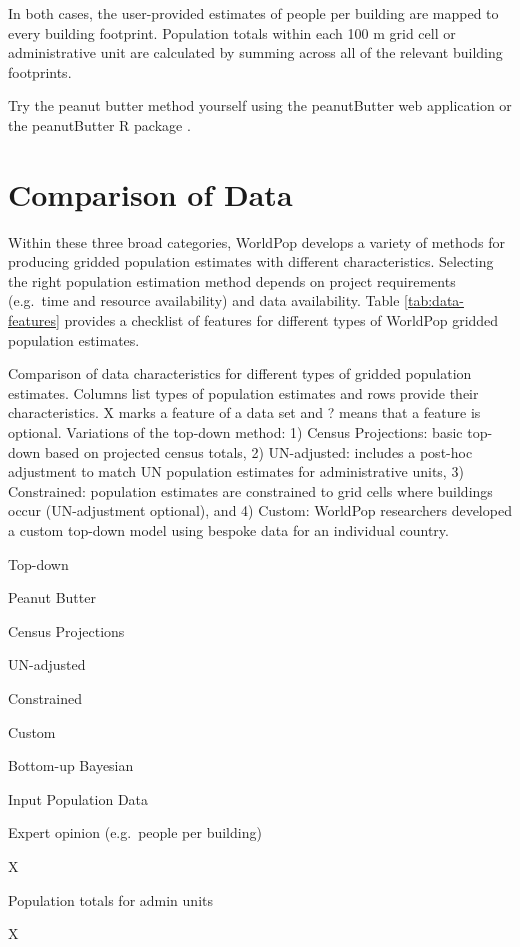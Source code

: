 \documentclass[]{book}
\begin{document}
In both cases, the user-provided estimates of people per building are
mapped to every building footprint. Population totals within each 100 m
grid cell or administrative unit are calculated by summing across all of
the relevant building footprints.

Try the peanut butter method yourself using the peanutButter web
application or the peanutButter R package
\citep{leasure2020peanutButter}.

\section{Comparison of Data}\label{comparison-of-data}

Within these three broad categories, WorldPop develops a variety of
methods for producing gridded population estimates with different
characteristics. Selecting the right population estimation method
depends on project requirements (e.g.~time and resource availability)
and data availability. Table \ref{tab:data-features} provides a
checklist of features for different types of WorldPop gridded population
estimates.

\label{tab:data-features}Comparison of data characteristics for different
types of gridded population estimates. Columns list types of population
estimates and rows provide their characteristics. X marks a feature of a
data set and ? means that a feature is optional. Variations of the
top-down method: 1) Census Projections: basic top-down based on
projected census totals, 2) UN-adjusted: includes a post-hoc adjustment
to match UN population estimates for administrative units, 3)
Constrained: population estimates are constrained to grid cells where
buildings occur (UN-adjustment optional), and 4) Custom: WorldPop
researchers developed a custom top-down model using bespoke data for an
individual country.

Top-down

Peanut Butter

Census Projections

UN-adjusted

Constrained

Custom

Bottom-up Bayesian

Input Population Data

Expert opinion (e.g.~people per building)

X

Population totals for admin units

X
\end{document}
